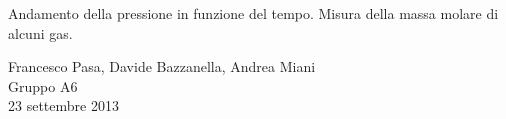 \begin{center}

	\vspace{0.5cm}
     	{\huge Andamento della pressione in funzione del tempo. Misura della massa molare di alcuni gas.}
	\vspace{0.5cm}

      	{\large Francesco Pasa, Davide Bazzanella, Andrea Miani} \\
		{\large Gruppo A6} \\
	
	\vspace{0.2cm}
      	{\large 23 settembre 2013}
    
    \vspace{0.7cm}

\end{center}
